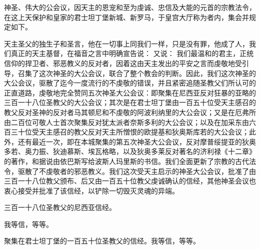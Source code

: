 \par

神圣、伟大的公会议，因天主的恩宠和至为虔诚、忠信及大能的元首的宗教法令，在这上天保护和皇家的君士坦丁堡新城、新罗马，于皇宫大厅称为者内，集会并规定如下。\par

天主圣父的独生子和圣言，他在一切事上同我们一样，只是没有罪，他成了人，我们真正的天主基督，在福音之言中明确宣告说： 又说： 我们最温和的君主，正统信仰的捍卫者、邪恶教义的反对者，因着这由天主发出的平安之言而虔敬地受引导，召集了这次神圣的大公会议，联合了整个教会的判断。因此，我们这次神圣的大公会议，驱散了迄今一度流行的不虔敬的错误，并且紧密追随圣教父们所认可的正直道路，虔敬地完全赞同五次神圣大公会议：即聚集在尼西亚反对狂暴的亚略的三百一十八位圣教父的大公会议；其次是在君士坦丁堡由一百五十位受天主感召的教父反对圣神的反对者马其顿尼和不虔敬的阿波利纳里的大公会议；又是在厄弗所由二百位可敬人士首次聚集反对犹太派者奈斯多利的大公会议；以及在加采东由六百三十位受天主感召的教父反对天主所憎恨的欧提基和狄奥斯库若的大公会议；此外，还有最近一次，即在本城聚集的第五次神圣大公会议，反对摩普绥提亚的狄奥多若、奥力振、狄迪慕斯、埃瓦格略，以及狄奥多莱反对著名的济利禄《十二章》的著作，和据说由依巴斯写给波斯人玛里斯的书信。我们全面更新了宗教的古代法令，驱散了不虔敬者的邪恶教义。我们这次受天主启示的神圣大公会议，批准了由三百一十八位教父颁布、后又由一百五十位教父虔诚确认的信经，其他神圣会议也衷心接受并批准了该信经，以铲除一切毁灭灵魂的异端。\par

三百一十八位圣教父的尼西亚信经。\par

我等信，等等。\par

聚集在君士坦丁堡的一百五十位圣教父的信经。我等信，等等。\par

